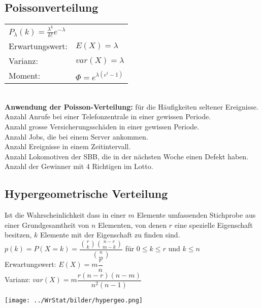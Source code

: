 \subsection{Poissonverteilung  }
	\begin{tabular}{ll}
    $P_\lambda(k)=\frac{\lambda^k}{k!}e^{-\lambda}$\\
    Erwartungswert: & $E(X)=\lambda$\\
    Varianz: & $var(X) =\lambda$\\
    Moment: &$\Phi = e^{\lambda (e^t-1)}$
    \end{tabular}
    \vspace{2mm}\\
    {\bf Anwendung der Poisson-Verteilung:} für die Häufigkeiten seltener Ereignisse. \\
    Anzahl Anrufe bei einer Telefonzentrale in einer gewissen Periode.\\
    Anzahl grosse Versicherungsschäden in einer gewissen Periode.\\
    Anzahl Jobs, die bei einem Server ankommen. \\
    Anzahl Ereignisse in einem Zeitintervall. \\
    Anzahl Lokomotiven der SBB, die in der nächsten Woche einen Defekt haben.\\
    Anzahl der Gewinner mit 4 Richtigen im Lotto.


\subsection{Hypergeometrische Verteilung  }
	\begin{minipage}{13cm}
    Ist die Wahrscheinlichkeit dass in einer $m$ Elemente umfassenden 
	Stichprobe aus einer Grundgesamtheit von $n$ Elementen, von denen $r$ eine
	spezielle Eigenschaft besitzen, $k$ Elemente mit der Eigenschaft zu
	finden sind.\\
	\vspace{5mm} 
	$p(k)=P(X=k)=\dfrac{\binom r k \binom{n-r}{m-k}}{\binom n m}$ 
    \hspace{10mm} für $0\leq k \leq r$ und $k \leq n$\\
    Erwartungswert: \hspace{10mm} $E(X)=m \dfrac{r}{n}$\\
    Varianz: \hspace{22mm} $var(X)=m \dfrac{r(n-r)(n-m)}{n^2(n-1)}$
    \end{minipage}
	\begin{minipage}{5cm}
    \texttt{[image: ../WrStat/bilder/hypergeo.png]}
    \end{minipage}
	
